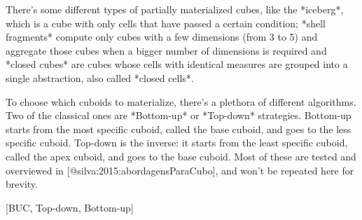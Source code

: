 There's some different types of partially materialized cubes, like the *iceberg*, which is a cube with only cells that have passed a certain condition; *shell fragments* compute only cubes with a few dimensions (from 3 to 5) and aggregate those cubes when a bigger number of dimensions is required and *closed cubes* are cubes whose cells with identical measures are grouped into a single abstraction, also called *closed cells*.

To choose which cuboids to materialize, there's a plethora of different algorithms.
Two of the classical ones are *Bottom-up* or *Top-down* strategies.
Bottom-up starts from the most specific cuboid, called the base cuboid, and goes to the less specific cuboid.
Top-down is the inverse: it starts from the least specific cuboid, called the apex cuboid, and goes to the base cuboid.
Most of these are tested and overviewed in [@silva:2015:abordagensParaCubo], and won't be repeated here for brevity.

[BUC, Top-down, Bottom-up]

